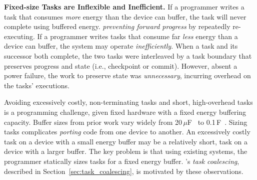 \textbf{Fixed-size Tasks are Inflexible and Inefficient.} If a programmer writes a task that consumes {\em more} energy than the device can buffer, the task will never complete using buffered energy. {\em preventing forward progress} by repeatedly re-executing. If a programmer writes tasks that consume far {\em less} energy than a device can buffer, the system may operate {\em inefficiently}. When a task and its successor both complete, the two tasks were interleaved by a task boundary that preserves progress and state (i.e., checkpoint or commit). However, absent a power failure, the work to preserve state was {\em unnecessary}, incurring overhead on the tasks' executions.

Avoiding excessively costly, non-terminating tasks and short, high-overhead tasks is a programming challenge, given fixed hardware with a fixed energy buffering capacity. Buffer sizes from prior work vary widely from 20\,$\mu $F~\cite{rodriguez_tbcs_2015} to 0.1\,F~\cite{moo}. Sizing tasks complicates {\em porting} code from one device to another. An excessively costly task on a device with a small energy buffer may be a relatively short, task on a device with a larger buffer. The key problem is that using existing systems, the programmer statically sizes tasks for a fixed energy buffer. \sys's {\em task coalescing}, described
in Section~\ref{sec:task_coalescing}, is motivated by these observations.
